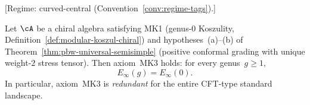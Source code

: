 \begin{theorem}\label{thm:pbw-propagation}
\textup{[Regime: curved-central
\textup{(}Convention~\textup{\ref{conv:regime-tags})}.]}

Let $\cA$ be a chiral algebra satisfying \textup{MK1}
\textup{(}genus-$0$ Koszulity,
Definition~\textup{\ref{def:modular-koszul-chiral})} and
hypotheses~\textup{(a)--(b)} of
Theorem~\textup{\ref{thm:pbw-universal-semisimple}}
\textup{(}positive conformal grading with unique
weight-$2$ stress tensor\textup{)}.
Then axiom~\textup{MK3} holds: for every genus~$g \geq 1$,
\[
E_\infty(g) = E_\infty(0).
\]
In particular, axiom~\textup{MK3} is \emph{redundant} for the
entire CFT-type standard landscape.
\end{theorem}

